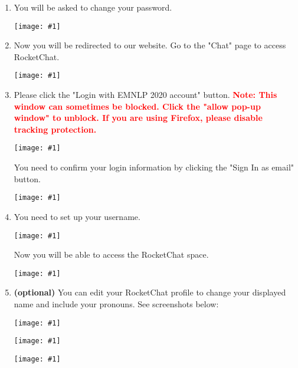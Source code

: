 \documentclass[11pt]{scrartcl}
\makeatletter
\newcommand{\vfig}[1]{%
	\begin{center}
		\texttt{[image: \#1]}
	\end{center}
}
\newcommand{\conferenceName}{EMNLP 2020\xspace}
\newcommand{\helpdeskEmail}{virtual.2020@emnlp.org}
\makeatother
\begin{document}
\begin{enumerate}
\begin{sloppypar}
			\textbf{\textcolor{red}{PLEASE NOTE}}:
			\begin{itemize}
				\item Make sure you received a welcome email with username (see \cref{step:registration})
				\item The username is case-sensitive
				\item Make sure there are no extra spaces in your password
				\item Try typing in the username/pwd instead of copy pasting (just to make sure you don't miss out on any characters). \textbf{The password has 8 characters in total.}
			\end{itemize}
	
			If you are still unable to login, please contact: \href{mailto:\helpdeskEmail}{\helpdeskEmail} and \textbf{include the username/password you were sent in the welcome email}.

		\end{sloppypar}

		\vfig{sign-in}
	\item You will be asked to change your password.
	
		\vfig{change-password}
	
	
	\item Now you will be redirected to our website. Go to the "Chat" page to access RocketChat.
	
		\vfig{chat-page}
	
	\item Please click the "Login with \conferenceName account" button. \textbf{\textcolor{red}{Note: This window can sometimes be blocked. Click the "allow pop-up window" to unblock. If you are using Firefox, please disable tracking protection.}}
	
		\vfig{rocket-chat-login}
	
		You need to confirm your login information by clicking the "Sign In as {{email}}" button.
		
		\vfig{sign-in-as}
		
	\item You need to set up your username.
	
		\vfig{register-username}
	
		Now you will be able to access the RocketChat space.
		
		\vfig{rocket-chat-space}
	
	\item \textbf{(optional)} You can edit your RocketChat profile to change your displayed name and include your pronouns. See screenshots below:
		
		\vfig{rocket-chat-profile-1}
		\vfig{rocket-chat-profile-2}
		\vfig{rocket-chat-profile-3}
\end{enumerate}
	
\end{document}

